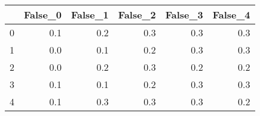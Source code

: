 \begin{tabular}{lrrrrr}
\toprule
{} &  False\_0 &  False\_1 &  False\_2 &  False\_3 &  False\_4 \\ \hline
\midrule
0 &      0.1 &      0.2 &      0.3 &      0.3 &      0.3 \\ \hline
1 &      0.0 &      0.1 &      0.2 &      0.3 &      0.3 \\ \hline
2 &      0.0 &      0.2 &      0.3 &      0.2 &      0.2 \\ \hline
3 &      0.1 &      0.1 &      0.2 &      0.3 &      0.3 \\ \hline
4 &      0.1 &      0.3 &      0.3 &      0.3 &      0.2 \\ \hline
\bottomrule
\end{tabular}
